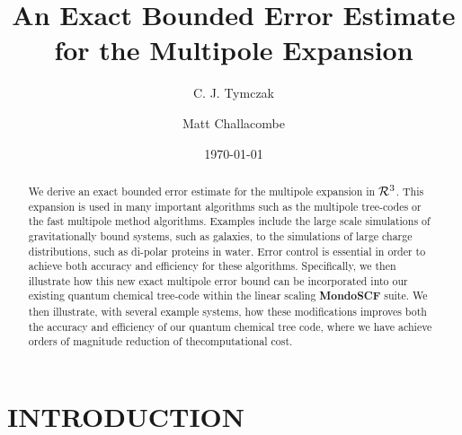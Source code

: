\documentclass[prb,aps,nobibnotes,twocolumn,doublespace,twocolumngrid,superbib]{revtex4}
\begin{document}
\title{An Exact Bounded Error Estimate for the Multipole Expansion}

\author{C. J. Tymczak}
\author{Matt Challacombe}


\date{\today}

\begin{abstract}
We derive an exact bounded error estimate for the multipole expansion in ${\cal R}^3$.
%
This expansion is used in many important algorithms such as the multipole tree-codes 
or the fast multipole method  algorithms. 
%
Examples include the large scale simulations of gravitationally bound systems, such as galaxies, to
the simulations of large charge distributions, such as di-polar proteins in water. 
%
Error control is essential in order to achieve both  accuracy and efficiency for these algorithms. 
%
Specifically, we then illustrate how this new exact multipole error bound can be incorporated 
into our existing  quantum chemical tree-code within the linear scaling {\bf MondoSCF} suite.
%  
We then illustrate, with several example systems,  how these modifications improves both the 
accuracy and efficiency of our quantum chemical tree code, where we have achieve orders of 
magnitude reduction of thecomputational cost.
%
\end{abstract}

\maketitle



\section{INTRODUCTION}
\end{document}
